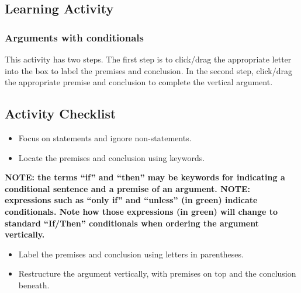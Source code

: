 \documentclass[
]{book}
\begin{document}
\hypertarget{learning-activity-4}{%
\subsection*{Learning Activity}\label{learning-activity-4}}

\hypertarget{arguments-with-conditionals}{%
\subsubsection*{Arguments with conditionals}\label{arguments-with-conditionals}}

This activity has two steps. The first step is to click/drag the appropriate letter into the box to label the premises and conclusion. In the second step, click/drag the appropriate premise and conclusion to complete the vertical argument.

\hypertarget{activity-checklist-3}{%
\subsection*{Activity Checklist}\label{activity-checklist-3}}

\begin{progress}
\begin{itemize}
\item
  Focus on statements and ignore non-statements.
\item
  Locate the premises and conclusion using keywords.
\end{itemize}
\end{progress}

\begin{caution}
\textbf{NOTE: the terms ``if'' and ``then'' may be keywords for indicating a conditional sentence and a premise of an argument. NOTE: expressions such as ``only if'' and ``unless'' (in green) indicate conditionals. Note how those expressions (in green) will change to standard ``If/Then'' conditionals when ordering the argument vertically.}
\end{caution}

\begin{progress}
\begin{itemize}
\item
  Label the premises and conclusion using letters in parentheses.
\item
  Restructure the argument vertically, with premises on top and the conclusion beneath.
\end{itemize}
\end{progress}
\end{document}
